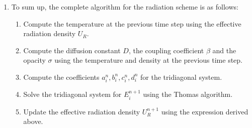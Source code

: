 \documentclass[11pt]{article}
\begin{document}
\begin{enumerate}
  \begin{equation}
      T^n_{i+\frac{1}{2}}=\sqrt[4]{\frac{[U_R]^n_{i+\frac{1}{2}}}{a}}
  \end{equation}
  and then substitute it into the relations for $D(T),\beta(T)$:
  \begin{gather}
      D_{i+\frac{1}{2}}^n = \frac{c}{3} g \left[T_{i+\frac{1}{2}}^n\right]^\alpha \left[\rho_{i+\frac{1}{2}}^n\right]^{-\lambda - 1} \\
      \beta_{i+\frac{1}{2}}^n = \frac{dU_R}{dU_m} = \frac{4a}{f\gamma} \left[T_{i+\frac{1}{2}}^n\right]^{4 - \gamma} \left[\rho_{i+\frac{1}{2}}^n\right]^{\mu - 1} \\
      \frac{1}{\sigma_{i+\frac{1}{2}}^n} = \frac{1}{\rho \kappa_R (T)} = g \left[T_{i+\frac{1}{2}}^n\right]^\alpha \left[\rho_{i+\frac{1}{2}}^n\right]^{-\lambda - 1}
  \end{gather}
  NOTE: In the coupled scheme, we will use the temperature $T_{i+\frac{1}{2}}^*$ computed from the hydrodynamics step \textbf{directly} to calculate $D,\beta,\sigma$ and substitute in the tridiagonal system, no need to go through $U_R$ in the coupled scheme.
  \item To sum up, the complete algorithm for the radiation scheme is as follows:
  \begin{enumerate}
    \item Compute the temperature at the previous time step using the effective radiation density $U_R$.
    \item Compute the diffusion constant $D$, the coupling coefficient $\beta$ and the opacity $\sigma$ using the temperature and density at the previous time step.
    \item Compute the coefficients $a_i^n,b_i^n,c_i^n,d_i^n$ for the tridiagonal system.
    \item Solve the tridiagonal system for $E_i^{n+1}$ using the Thomas algorithm.
    \item Update the effective radiation density $U_R^{n+1}$ using the expression derived above.
  \end{enumerate}
\end{enumerate}
\end{document}
